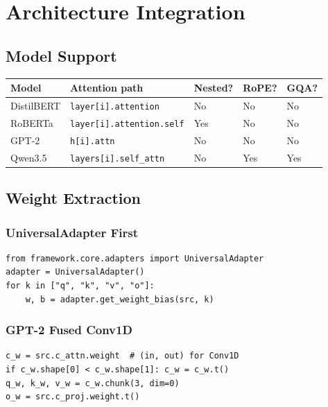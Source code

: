 \section{Architecture Integration}

\subsection{Model Support}

\begin{table}[H]
\centering
\small
\begin{tabular}{lllll}
\toprule
\textbf{Model} & \textbf{Attention path} & \textbf{Nested?} & \textbf{RoPE?} & \textbf{GQA?} \\
\midrule
DistilBERT & \texttt{layer[i].attention} & No & No & No \\
RoBERTa & \texttt{layer[i].attention.self} & Yes & No & No \\
GPT-2 & \texttt{h[i].attn} & No & No & No \\
Qwen3.5 & \texttt{layers[i].self\_attn} & No & Yes & Yes \\
\bottomrule
\end{tabular}
\end{table}

\subsection{Weight Extraction}

\subsubsection{UniversalAdapter First}

\begin{lstlisting}
from framework.core.adapters import UniversalAdapter
adapter = UniversalAdapter()
for k in ["q", "k", "v", "o"]:
    w, b = adapter.get_weight_bias(src, k)
\end{lstlisting}

\subsubsection{GPT-2 Fused Conv1D}

\begin{lstlisting}
c_w = src.c_attn.weight  # (in, out) for Conv1D
if c_w.shape[0] < c_w.shape[1]: c_w = c_w.t()
q_w, k_w, v_w = c_w.chunk(3, dim=0)
o_w = src.c_proj.weight.t()
\end{lstlisting}

